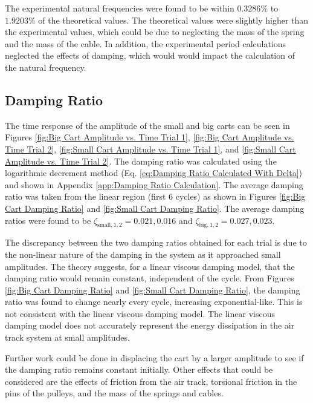 The experimental natural frequencies were found to be within $0.3286\%$ to $1.9203\%$ of the theoretical values. The theoretical values were slightly higher than the experimental values, which could be due to neglecting the mass of the spring and the mass of the cable. In addition, the experimental period calculations neglected the effects of damping, which would would impact the calculation of the natural frequency.

\subsection{Damping Ratio}
The time response of the amplitude of the small and big carts can be seen in Figures \ref{fig:Big Cart Amplitude vs. Time Trial 1}, \ref{fig:Big Cart Amplitude vs. Time Trial 2}, \ref{fig:Small Cart Amplitude vs. Time Trial 1}, and \ref{fig:Small Cart Amplitude vs. Time Trial 2}. The damping ratio was calculated using the logarithmic decrement method (Eq. \ref{eq:Damping Ratio Calculated With Delta}) and shown in Appendix \ref{app:Damping Ratio Calculation}. The average damping ratio was taken from the linear region (first 6 cycles) as shown in Figures \ref{fig:Big Cart Damping Ratio} and \ref{fig:Small Cart Damping Ratio}. The average damping ratios were found to be $\zeta_{\text{small}, 1, 2} = 0.021, 0.016$ and $\zeta_{\text{big}, 1, 2} = 0.027, 0.023$.  

The discrepancy between the two damping ratios obtained for each trial is due to the non-linear nature of the damping in the system as it approached small amplitudes. The theory suggests, for a linear viscous damping model, that the damping ratio would remain constant, independent of the cycle. From Figures \ref{fig:Big Cart Damping Ratio} and \ref{fig:Small Cart Damping Ratio}, the damping ratio was found to change nearly every cycle, increasing exponential-like. This is not consistent with the linear viscous damping model. The linear viscous damping model does not accurately represent the energy dissipation in the air track system at small amplitudes. 

Further work could be done in displacing the cart by a larger amplitude to see if the damping ratio remains constant initially. Other effects that could be considered are the effects of friction from the air track, torsional friction in the pins of the pulleys, and the mass of the springs and cables.

